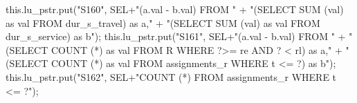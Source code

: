this.lu_pstr.put("S160", SEL+"(a.val - b.val) FROM "
    + "(SELECT SUM (val) as val FROM dur_s_travel) as a,"
    + "(SELECT SUM (val) as val FROM dur_s_service) as b");
\eatline
{}\nwendcode{}\endmoddef{}
this.lu_pstr.put("S161", SEL+"(a.val - b.val) FROM "
    + "(SELECT COUNT (*) as val FROM R WHERE ?>= re AND ? < rl) as a,"
    + "(SELECT COUNT (*) as val FROM assignments_r WHERE t <= ?) as b");
\eatline
{}\nwendcode{}\endmoddef{}
this.lu_pstr.put("S162", SEL+"COUNT (*) FROM assignments_r WHERE t <= ?");
\eatline
{}\nwendcode{}\nwdocspar
